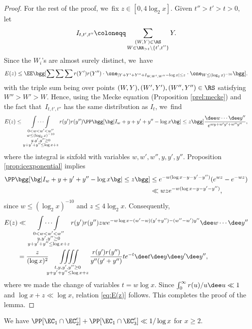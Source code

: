 \begin{proof}
For the rest of the proof, we~fix $z\in[0,4\log_2x]$.
Given $t''>t'>t > 0$, let
\[
I_{t,t',t''}\coloneqq \sum_{\substack{(W,Y)\in\RS\\ W\in\RR_{>t}\setminus\{t',t''\}}} Y.
\]
Since the $W_i$'s are almost surely distinct, we~have
\begin{align*}
E(z) \le \EE\bgg[ \mathop{\sum\sum\sum}
r(Y')r(Y'') \cdot \one_{|Y+Y'+Y''+I_{W,W',W''}-\log x|\le z} \cdot \one_{W \le (\log_2x)^{-10}} \bgg].
\end{align*}
with the triple sum being over points $(W,Y),(W',Y'),(W'',Y'')\in\RS$ satisfying \hbox{$W''>W'>W$}. Hence, using the Mecke equation (Proposition \ref{prel:mecke}) and the fact that~$I_{t, t', t''}$ has the same distribution as $I_{t}$, we~find
\[
E(z) \le \mathop{\int\cdots\int}\limits_{\substack{0<w<w'<w'' \\ w\le (\log_2x)^{-10} \\ y,y',y''\ge0 \\ y+y'+y''\le \log x+z }} r(y')r(y'')
\PP\bgg[ \bg|I_w+y+y'+y''-\log x\bg|\le z\bgg]
\frac{\dee w\cdots \dee y''}{ e^{wy+w'y'+w''y''}},
\]
where the integral is sixfold with variables $w,w',w'',y,y',y''$. Proposition \ref{prop:icexponential} implies
\begin{align*}
\PP\bgg[ \bg|I_w+y+y'+y''-\log x\bg|\le z\bgg] &\le e^{-w(\log x-y-y'-y'')} (e^{wz}-e^{-wz}) \\
&\ll wz e^{-w(\log x-y-y'-y'')},
\end{align*}
since $w\le(\log_2x)^{-10}$ and $z\le 4\log_2x$. Consequently,
\[
\begin{split}
E(z) &\ll
\mathop{\int\cdots\int}\limits_{\substack{0<w<w'<w'' \\ y,y',y''\ge0 \\ y+y'+y''\le \log x+z }} r(y')r(y'')
zwe^{-w\log x-(w'-w)(y'+y'')-(w''-w')y''}\dee w\cdots \dee y'' \\
&= \frac{z}{(\log x)^2} \iiiint\limits_{\substack{t,y,y',y''\ge 0 \\ y+y'+y''\le \log x+z }} \frac{r(y')r(y'')}{y''(y'+y'')}
t e^{-t} \dee t\dee y\dee y'\dee y'',
\end{split}
\]
where we made the change of variables $t=w\log x$. Since $\int_0^\infty r(u)/u \dee u\ll 1$ and $\log x+z\ll\log x$, relation \eqref{eq:E(z)} follows. This completes the proof of the lemma.
\end{proof}

\begin{lem}
\label{lem:prob e2c e3c}
We have $\PP[\EC_1 \cap \EC_2^c] + \PP[\EC_1 \cap \EC_3^c] \ll 1/\log x$ for $x\ge2$.
\end{lem}

